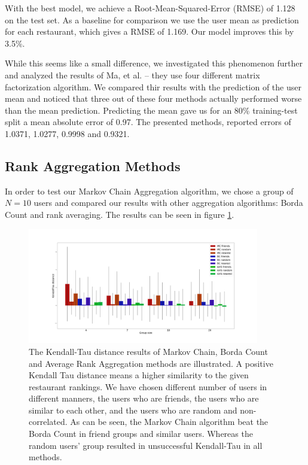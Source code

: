 \documentclass[a4paper]{article}
\begin{document}
With the best model, we achieve a Root-Mean-Squared-Error (RMSE) of 1.128 on the test set.
As a baseline for comparison we use the user mean as prediction for each restaurant, which gives a RMSE of 1.169. Our model improves this by 3.5\%.

While this seems like a small difference, we investigated this phenomenon further and analyzed the  results of Ma, et al. \cite{Ma08} -- they use four different matrix factorization algorithm. We compared thir results with the prediction of the user mean and noticed that three out of these four methods actually performed worse than the mean prediction. Predicting the mean gave us for an 80\% training-test split a mean absolute error of 0.97. The presented methods, reported errors of 1.0371, 1.0277, 0.9998 and 0.9321.

\subsection{Rank Aggregation Methods}

In order to test our Markov Chain Aggregation algorithm, we chose a group of $N=10$ users and compared our results with other aggregation algorithms: Borda Count and rank averaging. The results can be seen in figure \ref{fig:kendalltau}. 

\begin{figure}[h]
\centering
\includegraphics[width=0.9\textwidth]{kendalltau.png}
\caption{\label{fig:kendalltau}The Kendall-Tau distance results of Markov Chain, Borda Count and Average Rank Aggregation methods are illustrated. A positive Kendall Tau distance means a higher similarity to the given restaurant rankings. We have chosen different number of users in different manners, the users who are friends, the users who are similar to each other, and the users who are random and non-correlated. As can be seen, the Markov Chain algorithm beat the Borda Count in friend groups and similar users. Whereas the random users' group resulted in unsuccessful Kendall-Tau in all methods.}
\end{figure}
\end{document}
